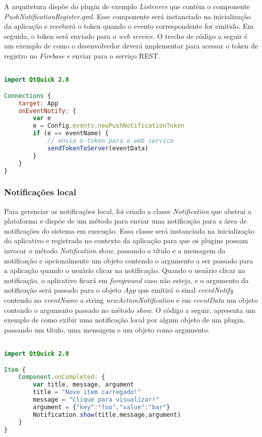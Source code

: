 A arquitetura dispõe do plugin de exemplo \textit{Listeners} que contém o componente \textit{PushNotificationRegister.qml}. Esse componente será instanciado na inicialização da aplicação e receberá o token quando o evento correspondente for emitido. Em seguida, o token será enviado para o \textit{web service}. O trecho de código a seguir é um exemplo de como o desenvolvedor deverá implementar para acessar o token de registro no \textit{Firebase} e enviar para o serviço REST.

\begin{center}
\begin{lstlisting}[language=qml]

import QtQuick 2.8

Connections {
    target: App
    onEventNotify: {
		var e
		e = Config.events.newPushNotificationToken
        if (e == eventName) {
            // envia o token para o web service
            sendTokenToServer(eventData)
        }
    }
}
\end{lstlisting}
\end{center}

\subsubsection{Notificações local}
Para gerenciar as notificações local, foi criado a classe \textit{Notification} que abstrai a plataforma e dispõe de um método para enviar uma notificação para a área de notificações do sistema em execução. Essa classe será instanciada na inicialização do aplicativo e registrada no contexto da aplicação para que os plugins possam invocar o método \textit{Notification.show}, passando o título e a mensagem da notificação e opcionalmente um objeto contendo o argumento a ser passado para a aplicação quando o usuário clicar na notificação. Quando o usuário clicar na notificação, o aplicativo ficará em \textit{foreground} caso não esteja, e o argumento da notificação será passado para o objeto \textit{App} que emitirá o sinal \textit{eventNotify} contendo no \textit{eventName} a string \textit{newActionNotification} e em \textit{eventData} um objeto contendo o argumento passado no método \textit{show}. O código a seguir, apresenta um exemplo de como exibir uma notificação local por algum objeto de um plugin, passando um título, uma mensagem e um objeto como argumento.

\begin{center}
\begin{lstlisting}[language=qml]

import QtQuick 2.8

Item {
    Component.onCompleted: {
		var title, message, argument
		title = "Novo item carregado!"
		message = "Clique para visualizar!"
		argument = {"key":"foo","value":"bar"}
		Notification.show(title,message,argument)
	}
}
\end{lstlisting}
\end{center}


